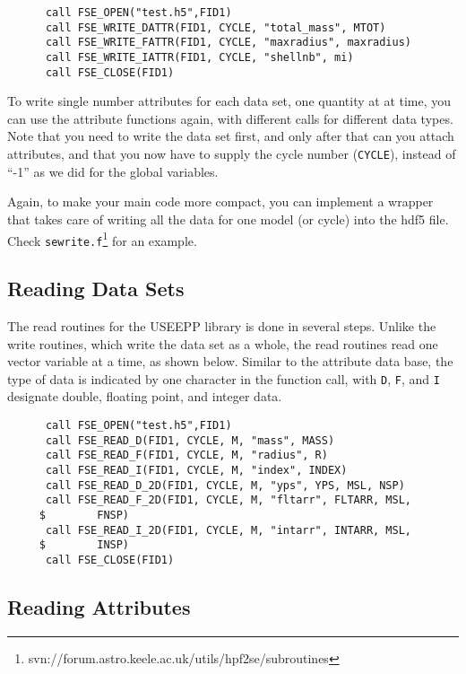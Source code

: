 \begin{verbatim}
      call FSE_OPEN("test.h5",FID1)
      call FSE_WRITE_DATTR(FID1, CYCLE, "total_mass", MTOT)
      call FSE_WRITE_FATTR(FID1, CYCLE, "maxradius", maxradius)
      call FSE_WRITE_IATTR(FID1, CYCLE, "shellnb", mi)
      call FSE_CLOSE(FID1)
\end{verbatim}

To write single number attributes for each data set, one quantity at at time, you can use the attribute functions again, with different calls for different data types. Note that you need to write the data set first, and only after that can you attach attributes, and that you now have to supply the cycle number (\verb!CYCLE!), instead of ``-1'' as we did for the global variables.

Again, to make your main code more compact, you can implement a wrapper that takes care of writing all the data for one model (or cycle) into the hdf5 file. Check
\verb!sewrite.f!\footnote{svn://forum.astro.keele.ac.uk/utils/hpf2se/subroutines} for an example.

\subsection{Reading Data Sets}

The read routines for the USEEPP library is done in several steps. Unlike the write routines, which write the data set as a whole, the read routines read one vector variable at a time, as shown below. Similar to the attribute data base, the type of data is indicated by one character in the function call, with \verb!D!, \verb!F!, and \verb!I! designate double, floating point, and integer data. 

\begin{verbatim}
      call FSE_OPEN("test.h5",FID1)
      call FSE_READ_D(FID1, CYCLE, M, "mass", MASS)
      call FSE_READ_F(FID1, CYCLE, M, "radius", R)
      call FSE_READ_I(FID1, CYCLE, M, "index", INDEX)
      call FSE_READ_D_2D(FID1, CYCLE, M, "yps", YPS, MSL, NSP)
      call FSE_READ_F_2D(FID1, CYCLE, M, "fltarr", FLTARR, MSL, 
     $        FNSP)
      call FSE_READ_I_2D(FID1, CYCLE, M, "intarr", INTARR, MSL, 
     $        INSP)
      call FSE_CLOSE(FID1)
\end{verbatim}

\subsection{Reading Attributes}

